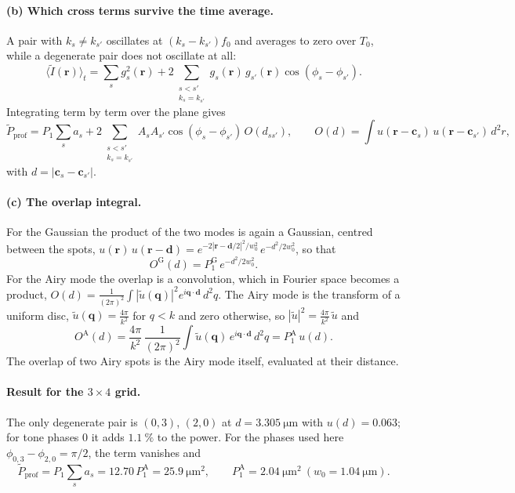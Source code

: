 \paragraph{(b) Which cross terms survive the time average.}
A pair with $k_s\neq k_{s'}$ oscillates at $(k_s-k_{s'})f_0$ and averages to zero over $T_0$, while a
degenerate pair does not oscillate at all:
\begin{equation}
\langle\tilde I(\mathbf r)\rangle_t=\sum_s g_s^2(\mathbf r)
+2\sum_{\substack{s<s'\\k_s=k_{s'}}}g_s(\mathbf r)\,g_{s'}(\mathbf r)\cos(\phi_s-\phi_{s'}).
\end{equation}
Integrating term by term over the plane gives
\begin{equation}
\tilde P_\text{prof}=P_1\sum_s a_s
+2\sum_{\substack{s<s'\\k_s=k_{s'}}}A_sA_{s'}\cos(\phi_s-\phi_{s'})\,O(d_{ss'}),
\qquad
O(d)=\int u(\mathbf r-\mathbf c_s)\,u(\mathbf r-\mathbf c_{s'})\,d^2r,
\label{eq:pprof}
\end{equation}
with $d=|\mathbf c_s-\mathbf c_{s'}|$.

\paragraph{(c) The overlap integral.}
For the Gaussian the product of the two modes is again a Gaussian, centred between the spots,
$u(\mathbf r)\,u(\mathbf r-\mathbf d)=e^{-2|\mathbf r-\mathbf d/2|^2/w_0^2}\,e^{-d^2/2w_0^2}$, so that
\begin{equation}
O^\text{G}(d)=P_1^\text{G}\,e^{-d^2/2w_0^2}.
\end{equation}
For the Airy mode the overlap is a convolution, which in Fourier space becomes a product,
$O(d)=\frac{1}{(2\pi)^2}\int|\tilde u(\mathbf q)|^2e^{i\mathbf q\cdot\mathbf d}\,d^2q$.
The Airy mode is the transform of a uniform disc, $\tilde u(\mathbf q)=\frac{4\pi}{k^2}$ for $q<k$ and
zero otherwise, so $|\tilde u|^2=\frac{4\pi}{k^2}\,\tilde u$ and
\begin{equation}
O^\text{A}(d)=\frac{4\pi}{k^2}\,\frac{1}{(2\pi)^2}\int\tilde u(\mathbf q)\,e^{i\mathbf q\cdot\mathbf d}\,d^2q
=P_1^\text{A}\,u(d).
\end{equation}
The overlap of two Airy spots is the Airy mode itself, evaluated at their distance.

\paragraph{Result for the $3\times4$ grid.}
The only degenerate pair is $(0,3)$, $(2,0)$ at $d=\SI{3.305}{\micro\metre}$ with $u(d)=0.063$; for
tone phases $0$ it adds $\SI{1.1}{\percent}$ to the power. For the phases used here
$\phi_{0,3}-\phi_{2,0}=\pi/2$, the term vanishes and
\begin{equation}
\tilde P_\text{prof}=P_1\sum_s a_s=12.70\,P_1^\text{A}=\SI{25.9}{\micro\metre\squared},
\qquad P_1^\text{A}=\SI{2.04}{\micro\metre\squared}\ (w_0=\SI{1.04}{\micro\metre}).
\end{equation}

